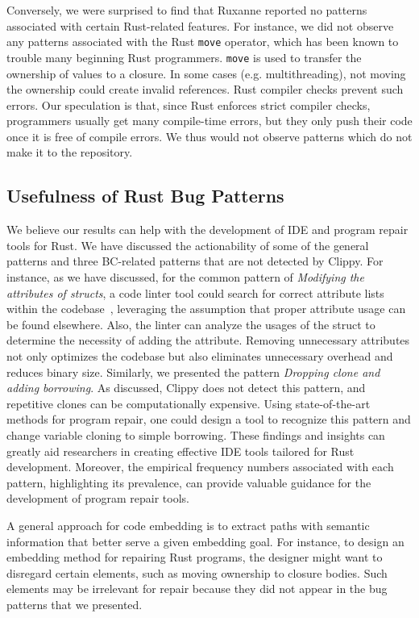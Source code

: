 Conversely, we were surprised to find that Ruxanne reported no patterns associated with certain Rust-related features. For instance, we did not observe any patterns associated with the Rust \verb+move+ operator, which has been known to trouble many beginning Rust programmers. \verb+move+ is used to transfer the ownership of values to a closure. In some cases (e.g. multithreading), not moving the ownership could create invalid references. Rust compiler checks prevent such errors. Our speculation is that, since Rust enforces strict compiler checks, programmers usually get many compile-time errors, but they only push their code once it is free of compile errors. We thus would not observe patterns which do not make it to the repository.

\subsection{Usefulness of Rust Bug Patterns}

We believe our results can help with the development of IDE and program repair tools for Rust. We have discussed the actionability of some of the general patterns and three BC-related patterns that are not detected by Clippy. For instance, as we have discussed, for the common pattern of \textit{Modifying the attributes of structs}, a code linter tool could search for correct attribute lists within the codebase~\citep{forrest2009genetic}, leveraging the assumption that proper attribute usage can be found elsewhere. Also, the linter can analyze the usages of the struct to determine the necessity of adding the attribute. Removing unnecessary attributes not only optimizes the codebase but also eliminates unnecessary overhead and reduces binary size. Similarly, we presented the pattern \textit{Dropping clone and adding borrowing}. As discussed, Clippy does not detect this pattern, and repetitive clones can be computationally expensive. Using state-of-the-art methods for program repair, one could design a tool to recognize this pattern and change variable cloning to simple borrowing. These findings and insights can greatly aid researchers in creating effective IDE tools tailored for Rust development. Moreover, the empirical frequency numbers associated with each pattern, highlighting its prevalence, can provide valuable guidance for the development of program repair tools.

A general approach for code embedding is to extract paths with semantic information that better serve a given embedding goal. For instance, to design an embedding method for repairing Rust programs, the designer might want to disregard certain elements, such as moving ownership to closure bodies. Such elements may be irrelevant for repair because they did not appear in the bug patterns that we presented.


